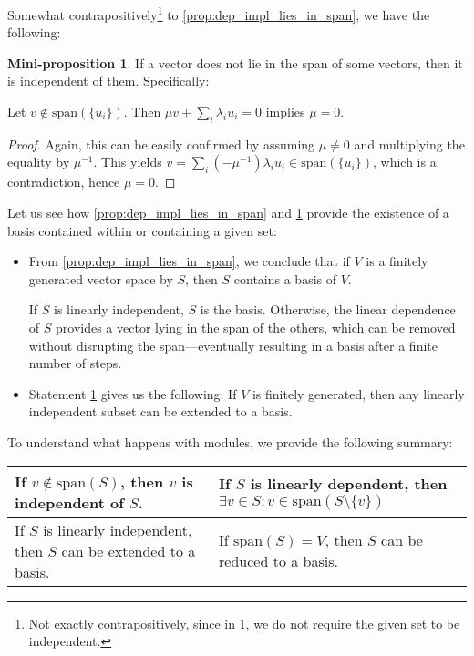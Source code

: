 \documentclass{article}
\newif\ifusemulticols
\theoremstyle{definition}
\newtheorem{miniprop}{Mini-proposition}[section]
\theoremstyle{remark}
\theoremstyle{plain}
\theoremstyle{plain}
\newenvironment{mymulticols}
    { \ifusemulticols \begin{multicols}{2} \fi }
    { \ifusemulticols \end{multicols} \fi }
\begin{document}
\begin{mymulticols}
Somewhat contrapositively\footnote{Not exactly contrapositively, since in
\ref{prop:not_in_span_inpl_indep}, we do not require the given set to be independent.} to
\ref{prop:dep_impl_lies_in_span}, we have the following:

\begin{miniprop}
    \label{prop:not_in_span_inpl_indep}
    If a vector does not lie in the span of some vectors, then it is independent of them. Specifically:

    Let $v \not\in \text{span}(\{u_i\})$. Then $\mu v + \sum_i \lambda_i u_i = 0$ implies $\mu = 0$.
\end{miniprop}
\begin{proof}
    Again, this can be easily confirmed by assuming $\mu \neq 0$ and multiplying the equality by $\mu^{-1}$.
    This yields $v = \sum_i \left(-\mu^{-1}\right)\lambda_i u_i \in \text{span}(\{u_i\})$, which is 
    a contradiction, hence $\mu = 0$.
\end{proof}

Let us see how \ref{prop:dep_impl_lies_in_span} and \ref{prop:not_in_span_inpl_indep} provide the
existence of a basis contained within or containing a given set:

\begin{itemize}
    \item From \ref{prop:dep_impl_lies_in_span}, we conclude that if $V$ is a finitely generated
        vector space by $S$, then $S$ contains a basis of $V$.

        If $S$ is linearly independent, $S$ is the basis. Otherwise, the linear dependence of $S$
        provides a vector lying in the span of the others, which can be removed without disrupting
        the span—eventually resulting in a basis after a finite number of steps.

    \item Statement \ref{prop:not_in_span_inpl_indep} gives us the following: If $V$ is finitely
        generated, then any linearly independent subset can be extended to a basis.
\end{itemize}

To understand what happens with modules, we provide the following summary:

\begin{table}[h]
    \begin{tabular}{L|L}
        If $v \not\in \text{span}(S)$, then $v$ is independent of $S$. &
        If $S$ is linearly dependent, then ${\exists v \in S}: {v \in \text{span}(S \setminus \{v\})}$ \\
        \hline
        If $S$ is linearly independent, then $S$ can be extended to a basis. &
        If $\text{span}(S) = V$, then $S$ can be reduced to a basis.
    \end{tabular}%
\end{table}


\end{mymulticols}
\end{document}
